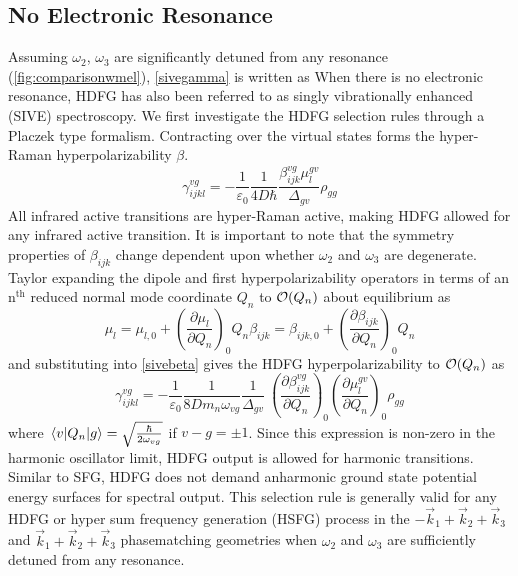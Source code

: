 \documentclass[aip, jcp, reprint, onecolumn]{revtex4-2}
\begin{document}
\subsection{No Electronic Resonance}
Assuming $\omega_2$, $\omega_3$ are significantly detuned from any resonance (\autoref{fig:comparisonwmel}),\cite{Placzek1934, Long1970, Altmann1982} \autoref{sivegamma} is written as 
When there is no electronic resonance, HDFG has also been referred to as singly vibrationally enhanced (SIVE) spectroscopy. \cite{RN352}
We first investigate the HDFG selection rules through a Placzek type formalism.
Contracting over the virtual states forms the hyper-Raman hyperpolarizability $\beta$.\cite{Long1970} 
\begin{equation}\label{sivebeta}
	\gamma_{ijkl}^{vg} =	-\frac{1}{\varepsilon_0} \frac{1}{4D \hbar}\frac{\beta^{vg}_{ijk} \mu^{gv}_{l}}{\Delta_{gv}} \rho_{gg}
\end{equation}
All infrared active transitions are hyper-Raman active, making HDFG allowed for any infrared active transition. \cite{Andrews1978}
It is important to note that the symmetry properties of $\beta_{ijk}$ change dependent upon whether $\omega_2$ and $\omega_3$ are degenerate. \cite{Denisov1986, Kozich2007}
Taylor expanding the dipole and first hyperpolarizability operators in terms of an n$^{\text{th}}$ reduced normal mode coordinate $Q_n$ to $\order{Q_n}$ about equilibrium as\cite{Long1970, Shen90}
\begin{subequations}
	\begin{equation}
		\mu_l = \mu_{l,0} + \left(\frac{\partial \mu_l}{\partial Q_n}\right)_0 Q_n 
	\end{equation}
	\begin{equation}
		\beta_{ijk} = \beta_{ijk,0} + \left(\frac{\partial \beta_{ijk}}{\partial Q_n}\right)_0 Q_n
	\end{equation}
\end{subequations}
and substituting into \autoref{sivebeta} gives the HDFG hyperpolarizability to $\order{Q_n}$ as \begin{equation}\label{SIVEselection}
	\gamma_{ijkl}^{vg} =	-\frac{1}{\varepsilon_0} \frac{1}{8D m_n \omega_{vg}}  \frac{1}{{\Delta_{gv}}} \ \left(\frac{\partial \beta^{vg}_{ijk}}{\partial Q_n}\right)_0 \left({\frac{\partial \mu^{gv}_{l}}{\partial Q_n}}\right)_0  \rho_{gg}
\end{equation}
where $\mel{v}{Q_n}{g} = \sqrt{\frac{\hbar}{2\omega_{vg}}}$ if $v-g = \pm 1$.  \cite{RN230}
Since this expression is non-zero in the harmonic oscillator limit, HDFG output is allowed for harmonic transitions. 
Similar to SFG, HDFG does not demand anharmonic ground state potential energy surfaces for spectral output. \cite{Shen94, Cho2000}
This selection rule is generally valid for any HDFG or hyper sum frequency generation (HSFG) process in the $-\vec{k}_1 + \vec{k}_2  + \vec{k}_3$ and $\vec{k}_1 + \vec{k}_2  + \vec{k}_3$ phasematching geometries when $\omega_2$ and $\omega_3$ are sufficiently detuned from any resonance.
\end{document}
